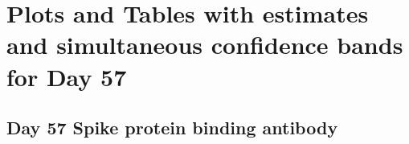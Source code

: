 \documentclass[]{book}
\theoremstyle{definition}
\theoremstyle{definition}
\theoremstyle{definition}
\newcommand{\1}{\mathbbm{1}}
\begin{document}
\clearpage

\clearpage

\hypertarget{plots-and-tables-with-estimates-and-simultaneous-confidence-bands-for-day-57}{%
\section{Plots and Tables with estimates and simultaneous confidence bands for Day 57}\label{plots-and-tables-with-estimates-and-simultaneous-confidence-bands-for-day-57}}

\clearpage

\hypertarget{day-57-spike-protein-binding-antibody-2}{%
\subsection{Day 57 Spike protein binding antibody}\label{day-57-spike-protein-binding-antibody-2}}
\end{document}
